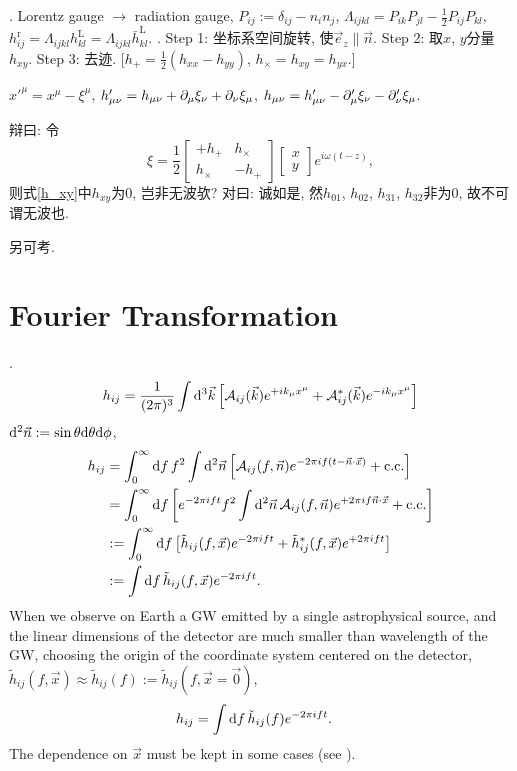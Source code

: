 \cite{Maggiore2014}. Lorentz gauge $\to$ radiation gauge, $P_{ij}:=\delta_{ij}-n_in_j$, $\Lambda_{ijkl}=P_{ik}P_{jl}-\frac{1}{2}P_{ij}P_{kl}$, $h_{ij}^\text{r}=\Lambda_{ijkl}h_{kl}^\text{L}=\Lambda_{ijkl}\bar{h}_{kl}^\text{L}$. \cite{Sathyaprakash2009}. Step 1: 坐标系空间旋转, 使$\vec{e}_z\parallel\vec{n}$. Step 2: 取$x$, $y$分量$h_{xy}$. Step 3: 去迹. [$h_+=\frac{1}{2}(h_{xx}-h_{yy})$, $h_\times=h_{xy}=h_{yx}$.]

$x'^\mu=x^\mu-\xi^\mu$, $h'_{\mu\nu}=h_{\mu\nu}+\partial_\mu\xi_\nu+\partial_\nu\xi_\mu$, $h_{\mu\nu}=h'_{\mu\nu}-\partial'_\mu\xi_\nu-\partial'_\nu\xi_\mu$.

辩曰: 令
\begin{equation}
    \xi=\frac{1}{2}\begin{bmatrix}
        +h_+&h_\times\\
        h_\times&-h_+
   \end{bmatrix}\begin{bmatrix}
    x\\y
    \end{bmatrix}e^{i\omega(t-z)},
\end{equation}
则式\eqref{h_xy}中$h_{xy}$为$0$, 岂非无波欤? 对曰: 诚如是, 然$h_{01}$, $h_{02}$, $h_{31}$, $h_{32}$非为$0$, 故不可谓无波也.

另可考\cite{Jaranowski2009}.

\section{Fourier Transformation}

\cite{Maggiore2014}. 
\begin{equation}
    h_{ij}=\frac{1}{(2\pi)^3}\int\mathrm{d}^3\vec{k}\left[\mathcal{A}_{ij}(\vec{k})e^{+ik_\mu x^\mu}+\mathcal{A}_{ij}^*(\vec{k})e^{-ik_\mu x^\mu}\right]
\end{equation}
$\mathrm{d}^2\vec{n}:=\sin\theta\mathrm{d}\theta\mathrm{d}\phi$,
\begin{align}
    h_{ij}&=\int_0^\infty\mathrm{d} f\, f^2\int\mathrm{d}^2\vec{n}\left[\mathcal{A}_{ij}(f,\vec{n})e^{-2\pi i f(t-\vec{n}\cdot\vec{x})}+\text{c.c.}\right]\\
    &=\int_0^\infty\mathrm{d} f\left[e^{-2\pi i ft}f^2\int\mathrm{d}^2\vec{n}\,\mathcal{A}_{ij}(f,\vec{n})e^{+2\pi i f\vec{n}\cdot\vec{x}}+\text{c.c.}\right]\\
    &:=\int_0^\infty\mathrm{d} f\left[\tilde{h}_{ij}(f,\vec{x})e^{-2\pi i ft}+\tilde{h}_{ij}^*(f,\vec{x})e^{+2\pi i ft}\right]\\
    &:=\int\mathrm{d} f\,\tilde{h}_{ij}(f,\vec{x})e^{-2\pi i ft}.
\end{align}
When we observe on Earth a GW emitted by a single astrophysical source, and the linear dimensions of the detector are much smaller than wavelength of the GW, choosing the origin of the coordinate system centered on the detector, $\tilde{h}_{ij}(f,\vec{x})\approx\tilde{h}_{ij}(f):=\tilde{h}_{ij}(f,\vec{x}=\vec{0})$,
\begin{align}
    h_{ij}&=\int\mathrm{d} f\,\tilde{h}_{ij}(f)e^{-2\pi i ft}.
\end{align}
The dependence on $\vec{x}$ must be kept in some cases (see \cite{Maggiore2014}).

